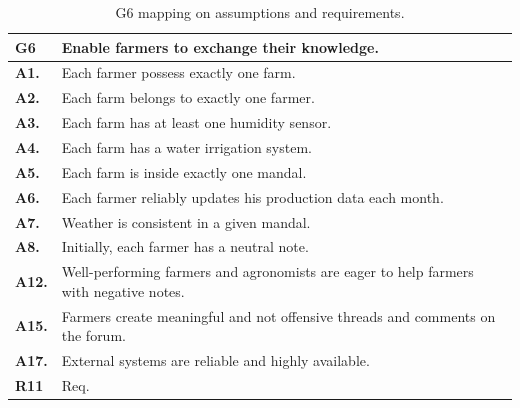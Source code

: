 \begin{table}[H]
    \centering
    \begin{tabularx}{\linewidth}{lX} \toprule
        \textbf{G6} & Enable farmers to exchange their knowledge. \\ 
        \midrule
        \textbf{A1.} & Each farmer possess exactly one farm.\\
        \textbf{A2.} & Each farm belongs to exactly one farmer.\\ 
        \textbf{A3.} & Each farm has at least one humidity sensor.\\ 
        \textbf{A4.} & Each farm has a water irrigation system.\\ 
        \textbf{A5.} & Each farm is inside exactly one mandal.\\ 
        \textbf{A6.} & Each farmer reliably updates his production data each month.\\ 
        \textbf{A7.} & Weather is consistent in a given mandal.\\ 
        \textbf{A8.} & Initially, each farmer has a neutral note.\\ 
        \textbf{A12.} & Well-performing farmers and agronomists are eager to help farmers with negative notes.\\ 
        \textbf{A15.} & Farmers create meaningful and not offensive threads and comments on the forum.\\ 
        \textbf{A17.} & External systems are reliable and highly available.\\
        \midrule
        \textbf{R11} &  Req. \\
        \bottomrule
    \end{tabularx}
    \caption{G6 mapping on assumptions and requirements.}
\end{table}


